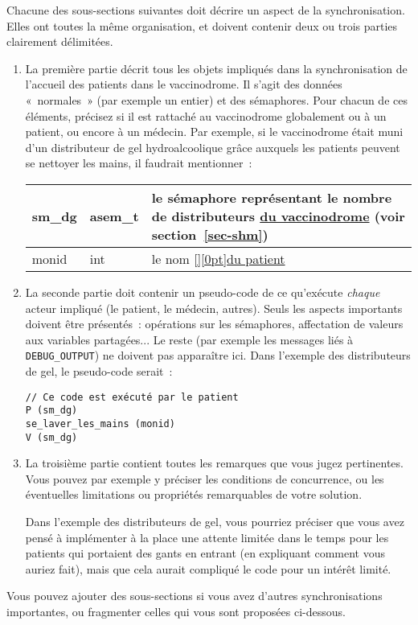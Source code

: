 \documentclass[a4paper]{article}
\makeatletter
\newenvironment{expl}{%
  \begin{list}{}{%
      \small\itshape%
      \topsep\z@%
      \listparindent0pt%
      \parsep0.75\baselineskip%
      \setlength{\leftmargin}{20mm}%
      \setlength{\rightmargin}{20mm}%
    }
  \item[]}%
  {\end{list}}
\makeatother
\begin{document}
\begin{expl}
  Chacune des sous-sections suivantes doit décrire un aspect de la
  synchronisation. Elles ont toutes la même organisation, et doivent
  contenir deux ou trois parties clairement délimitées.

  \begin{enumerate}

  \item La première partie décrit tous les objets impliqués dans la
    synchronisation de l'accueil des patients dans le vaccinodrome. Il
    s'agit des données «~normales~» (par exemple un entier) et des
    sémaphores. Pour chacun de ces éléments, précisez si il est
    rattaché au vaccinodrome globalement ou à un patient, ou encore à
    un médecin. Par exemple, si le vaccinodrome était muni d'un
    distributeur de gel hydroalcoolique grâce auxquels les patients
    peuvent se nettoyer les mains, il faudrait mentionner~:

    \begin{tabularx}{\linewidth}{|l|l|>{\strut}X|}
      \hline%
      sm\_dg & asem\_t & le sémaphore représentant le nombre de
      distributeurs \underline{du vaccinodrome} (voir
      section~\ref{sec-shm}) \\ \hline%
      monid & int & le nom %
      \underline{\raisebox{0pt}[\height][0pt]{du patient}} \\ \hline%
    \end{tabularx}

  \item La seconde partie doit contenir un pseudo-code de ce
    qu'exécute \emph{chaque} acteur impliqué (le patient, le médecin,
    autres). Seuls les aspects importants doivent être présentés~:
    opérations sur les sémaphores, affectation de valeurs aux
    variables partagées... Le reste (par exemple les messages liés à
    \texttt{DEBUG\_OUTPUT}) ne doivent pas apparaître ici. Dans
    l'exemple des distributeurs de gel, le pseudo-code serait~:

\begin{verbatim}
// Ce code est exécuté par le patient
P (sm_dg)
se_laver_les_mains (monid)
V (sm_dg)
\end{verbatim}

  \item La troisième partie contient toutes les remarques que vous
    jugez pertinentes. Vous pouvez par exemple y préciser les
    conditions de concurrence, ou les éventuelles limitations ou
    propriétés remarquables de votre solution.

    Dans l'exemple des distributeurs de gel, vous pourriez préciser
    que vous avez pensé à implémenter à la place une attente limitée
    dans le temps pour les patients qui portaient des gants en entrant
    (en expliquant comment vous auriez fait), mais que cela aurait
    compliqué le code pour un intérêt limité.
  \end{enumerate}

  Vous pouvez ajouter des sous-sections si vous avez d'autres
  synchronisations importantes, ou fragmenter celles qui vous sont
  proposées ci-dessous.
\end{expl}
\end{document}
